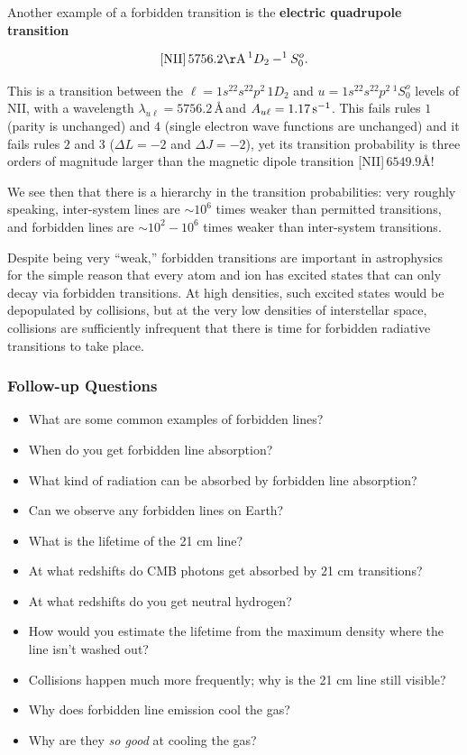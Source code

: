 \documentclass[a4paper,10pt]{article}
\begin{document}
{\noindent}Another example of a forbidden transition is the \textbf{electric quadrupole transition}

\begin{align*}
    {\rm [NII]}\,5756.2{\rm \AA}\,^1D_2-^1S_0^o.
\end{align*}

{\noindent}This is a transition between the $\ell=1s^22s^22p^2\,1D_2$ and $u=1s^22s^22p^2\,^1S_0^o$ levels of NII, with a wavelength $\lambda_{u\ell}=5756.2$\,\AA\,and $A_{u\ell}=1.17\,{\rm s^{-1}}$. This fails rules $1$ (parity is unchanged) and $4$ (single electron wave functions are unchanged) and it fails rules $2$ and $3$ ($\Delta L=-2$ and $\Delta J=-2$), yet its transition probability is three orders of magnitude larger than the magnetic dipole transition [NII]\,$6549.9$\AA!

{\noindent}We see then that there is a hierarchy in the transition probabilities: very roughly speaking, inter-system lines are $\sim10^6$ times weaker than permitted transitions, and forbidden lines are $\sim10^2-10^6$ times weaker than inter-system transitions.

{\noindent}Despite being very ``weak,'' forbidden transitions are important in astrophysics for the simple reason that every atom and ion has excited states that can only decay via forbidden transitions. At high densities, such excited states would be depopulated by collisions, but at the very low densities of interstellar space, collisions are sufficiently infrequent that there is time for forbidden radiative transitions to take place.

\subsubsection{Follow-up Questions}

\begin{itemize}
    \item What are some common examples of forbidden lines?
    \item When do you get forbidden line absorption?
    \item What kind of radiation can be absorbed by forbidden line absorption?
    \item Can we observe any forbidden lines on Earth?
    \item What is the lifetime of the 21 cm line?
    \item At what redshifts do CMB photons get absorbed by 21 cm transitions?
    \item At what redshifts do you get neutral hydrogen?
    \item How would you estimate the lifetime from the maximum density where the line isn't washed out?
    \item Collisions happen much more frequently; why is the 21 cm line still visible?
    \item Why does forbidden line emission cool the gas?
    \item Why are they \textit{so good} at cooling the gas?
\end{itemize}
\end{document}
